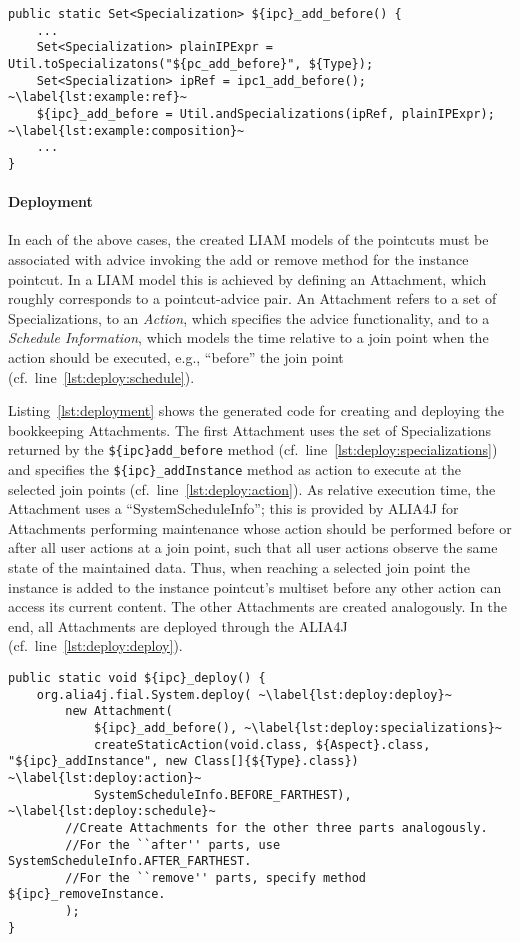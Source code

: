 \begin{lstlisting}[caption={Generated code for creating the LIAM model for the add/before pointcut of the instance pointcut created with expression refinement},label={lst:example:exprRef}]
public static Set<Specialization> ${ipc}_add_before() {
	...
	Set<Specialization> plainIPExpr = Util.toSpecializatons("${pc_add_before}", ${Type});
	Set<Specialization> ipRef = ipc1_add_before(); ~\label{lst:example:ref}~
	${ipc}_add_before = Util.andSpecializations(ipRef, plainIPExpr); ~\label{lst:example:composition}~
	...
}
\end{lstlisting}

\paragraph{Deployment}

In each of the above cases, the created LIAM models of the pointcuts must be associated with advice invoking the add or remove method for the instance pointcut.
In a LIAM model this is achieved by defining an Attachment, which roughly corresponds to a pointcut-advice pair.
An Attachment refers to a set of Specializations, to an \emph{Action}, which specifies the advice functionality, and to a \emph{Schedule Information}, which models the time relative to a join point when the action should be executed, e.g., ``before'' the join point (cf.\ line~\ref{lst:deploy:schedule}).

Listing~\ref{lst:deployment} shows the generated code for creating and deploying the bookkeeping Attachments.
The first Attachment uses the set of Specializations returned by the \lstinline!${ipc}add_before! method (cf.\ line~\ref{lst:deploy:specializations}) and specifies the \lstinline!${ipc}_addInstance! method as action to execute at the selected join points (cf.\ line~\ref{lst:deploy:action}).
As relative execution time, the Attachment uses a ``SystemScheduleInfo''; this is provided by ALIA4J for Attachments performing maintenance whose action should be performed before or after all user actions at a join point, such that all user actions observe the same state of the maintained data.
Thus, when reaching a selected join point the instance is added to the instance pointcut's multiset before any other action can access its current content.
The other Attachments are created analogously.
In the end, all Attachments are deployed through the ALIA4J  (cf.\ line~\ref{lst:deploy:deploy}).

\begin{lstlisting}[float,caption={Deployment of the bookkeeping for an instance pointcut.},label=lst:deployment]
public static void ${ipc}_deploy() {
	org.alia4j.fial.System.deploy( ~\label{lst:deploy:deploy}~
		new Attachment(
			${ipc}_add_before(), ~\label{lst:deploy:specializations}~
			createStaticAction(void.class, ${Aspect}.class, "${ipc}_addInstance", new Class[]{${Type}.class}) ~\label{lst:deploy:action}~
			SystemScheduleInfo.BEFORE_FARTHEST), ~\label{lst:deploy:schedule}~
		//Create Attachments for the other three parts analogously.
		//For the ``after'' parts, use SystemScheduleInfo.AFTER_FARTHEST.
		//For the ``remove'' parts, specify method ${ipc}_removeInstance.
		);
}
\end{lstlisting}


